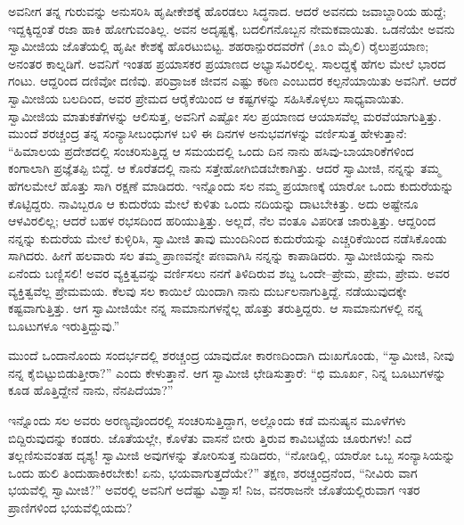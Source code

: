 ಅವನೀಗ ತನ್ನ ಗುರುವನ್ನು ಅನುಸರಿಸಿ ಹೃಷೀಕೇಶಕ್ಕೆ ಹೊರಡಲು ಸಿದ್ಧನಾದ. ಆದರೆ ಅವನದು ಜವಾಬ್ದಾರಿಯ ಹುದ್ದೆ; ಇದ್ದಕ್ಕಿದ್ದಂತೆ ರಜಾ ಹಾಕಿ ಹೋಗುವಂತಿಲ್ಲ. ಅವನ ಅದೃಷ್ಟಕ್ಕೆ, ಬದಲಿಗನೊಬ್ಬನ ನೇಮಕವಾಯಿತು. ಒಡನೆಯೇ ಅವನು ಸ್ವಾಮೀಜಿಯ ಜೊತೆಯಲ್ಲಿ ಹೃಷೀ ಕೇಶಕ್ಕೆ ಹೊರಟುಬಿಟ್ಟ. ಶಹರಾನ್ಪುರದವರೆಗೆ (೨೩೦ ಮೈಲಿ) ರೈಲುಪ್ರಯಾಣ; ಅನಂತರ ಕಾಲ್ನಡಿಗೆ. ಅವನಿಗೆ ಇಂತಹ ಪ್ರಯಾಸಕರ ಪ್ರಯಾಣದ ಅಭ್ಯಾಸವಿರಲಿಲ್ಲ. ಸಾಲದ್ದಕ್ಕೆ ಹೆಗಲ ಮೇಲೆ ಭಾರದ ಗಂಟು. ಆದ್ದರಿಂದ ದಣಿವೋ ದಣಿವು. ಪರಿವ್ರಾಜಕ ಜೀವನ ಎಷ್ಟು ಕಠಿಣ ಎಂಬುದರ ಕಲ್ಪನೆಯಾಯಿತು ಅವನಿಗೆ. ಆದರೆ ಸ್ವಾಮೀಜಿಯ ಬಲದಿಂದ, ಅವರ ಪ್ರೇಮದ ಆರೈಕೆಯಿಂದ ಆ ಕಷ್ಟಗಳನ್ನು ಸಹಿಸಿಕೊಳ್ಳಲು ಸಾಧ್ಯವಾಯಿತು. ಸ್ವಾಮೀಜಿಯ ಮಾತುಕತೆಗಳನ್ನು ಆಲಿಸುತ್ತ, ಅವನಿಗೆ ಎಷ್ಟೋ ಸಲ ಪ್ರಯಾಣದ ಆಯಾಸವೆಲ್ಲ ಮರವೆಯಾಗುತ್ತಿತ್ತು. ಮುಂದೆ ಶರಚ್ಚಂದ್ರ ತನ್ನ ಸಂನ್ಯಾಸೀಬಂಧುಗಳ ಬಳಿ ಈ ದಿನಗಳ ಅನುಭವಗಳನ್ನು ವರ್ಣಿಸುತ್ತ ಹೇಳುತ್ತಾನೆ: “ಹಿಮಾಲಯ ಪ್ರದೇಶದಲ್ಲಿ ಸಂಚರಿಸುತ್ತಿದ್ದ ಆ ಸಮಯದಲ್ಲಿ ಒಂದು ದಿನ ನಾನು ಹಸಿವು-ಬಾಯಾರಿಕೆಗಳಿಂದ ಕಂಗಾಲಾಗಿ ಪ್ರಜ್ಞೆತಪ್ಪಿ ಬಿದ್ದೆ. ಆ ಕೊರೆತದಲ್ಲಿ ನಾನು ಸತ್ತೇಹೋಗಿಬಿಡಬೇಕಾಗಿತ್ತು. ಆದರೆ ಸ್ವಾಮೀಜಿ, ನನ್ನನ್ನು ತಮ್ಮ ಹೆಗಲಮೇಲೆ ಹೊತ್ತು ಸಾಗಿ ರಕ್ಷಣೆ ಮಾಡಿದರು. ಇನ್ನೊಂದು ಸಲ ನಮ್ಮ ಪ್ರಯಾಣಕ್ಕೆ ಯಾರೋ ಒಂದು ಕುದುರೆಯನ್ನು ಕೊಟ್ಟಿದ್ದರು. ನಾವಿಬ್ಬರೂ ಆ ಕುದುರೆಯ ಮೇಲೆ ಕುಳಿತು ಒಂದು ನದಿಯನ್ನು ದಾಟಬೇಕಿತ್ತು. ಅದು ಅಷ್ಟೇನೂ ಆಳವಿರಲಿಲ್ಲ; ಆದರೆ ಬಹಳ ರಭಸದಿಂದ ಹರಿಯುತ್ತಿತ್ತು. ಅಲ್ಲದೆ, ನೆಲ ವಂತೂ ವಿಪರೀತ ಜಾರುತ್ತಿತ್ತು. ಆದ್ದರಿಂದ ನನ್ನನ್ನು ಕುದುರೆಯ ಮೇಲೆ ಕುಳ್ಳಿರಿಸಿ, ಸ್ವಾಮೀಜಿ ತಾವು ಮುಂದಿನಿಂದ ಕುದುರೆಯನ್ನು ಎಚ್ಚರಿಕೆಯಿಂದ ನಡೆಸಿಕೊಂಡು ಸಾಗಿದರು. ಹೀಗೆ ಹಲವಾರು ಸಲ ತಮ್ಮ ಪ್ರಾಣವನ್ನೇ ಪಣವಾಗಿಸಿ ನನ್ನನ್ನು ಕಾಪಾಡಿದರು. ಸ್ವಾಮೀಜಿಯನ್ನು ನಾನು ಏನೆಂದು ಬಣ್ಣಿಸಲಿ! ಅವರ ವ್ಯಕ್ತಿತ್ವವನ್ನು ವರ್ಣಿಸಲು ನನಗೆ ತಿಳಿದಿರುವ ಶಬ್ದ ಒಂದೇ–ಪ್ರೇಮ, ಪ್ರೇಮ, ಪ್ರೇಮ. ಅವರ ವ್ಯಕ್ತಿತ್ವವೆಲ್ಲ ಪ್ರೇಮಮಯ. ಕೆಲವು ಸಲ ಕಾಯಿಲೆ ಯಿಂದಾಗಿ ನಾನು ದುರ್ಬಲನಾಗುತ್ತಿದ್ದೆ. ನಡೆಯುವುದಕ್ಕೇ ಕಷ್ಟವಾಗುತ್ತಿತ್ತು. ಆಗ ಸ್ವಾಮೀಜಿಯೇ ನನ್ನ ಸಾಮಾನುಗಳನ್ನೆಲ್ಲ ಹೊತ್ತು ತರುತ್ತಿದ್ದರು. ಆ ಸಾಮಾನುಗಳಲ್ಲಿ ನನ್ನ ಬೂಟುಗಳೂ ಇರುತ್ತಿದ್ದುವು.”

ಮುಂದೆ ಒಂದಾನೊಂದು ಸಂದರ್ಭದಲ್ಲಿ ಶರಚ್ಚಂದ್ರ ಯಾವುದೋ ಕಾರಣದಿಂದಾಗಿ ದುಃಖಗೊಂಡು, “ಸ್ವಾಮೀಜಿ, ನೀವು ನನ್ನ ಕೈಬಿಟ್ಟುಬಿಡುತ್ತೀರಾ?” ಎಂದು ಕೇಳುತ್ತಾನೆ. ಆಗ ಸ್ವಾಮೀಜಿ ಛೇಡಿಸುತ್ತಾರೆ: “ಛಿ ಮೂರ್ಖ, ನಿನ್ನ ಬೂಟುಗಳನ್ನು ಕೂಡ ಹೊತ್ತಿದ್ದೇನೆ ನಾನು, ನೆನಪಿದೆಯಾ?”

ಇನ್ನೊಂದು ಸಲ ಅವರು ಅರಣ್ಯವೊಂದರಲ್ಲಿ ಸಂಚರಿಸುತ್ತಿದ್ದಾಗ, ಅಲ್ಲೊಂದು ಕಡೆ ಮನುಷ್ಯನ ಮೂಳೆಗಳು ಬಿದ್ದಿರುವುದನ್ನು ಕಂಡರು. ಜೊತೆಯಲ್ಲೇ, ಕೊಳೆತು ವಾಸನೆ ಬೀರು ತ್ತಿರುವ ಕಾವಿಬಟ್ಟೆಯ ಚೂರುಗಳು! ಎದೆ ತಲ್ಲಣಿಸುವಂತಹ ದೃಶ್ಯ! ಸ್ವಾಮೀಜಿ ಅವುಗಳನ್ನು ತೋರಿಸುತ್ತ ನುಡಿದರು, “ನೋಡಿಲ್ಲಿ, ಯಾರೋ ಒಬ್ಬ ಸಂನ್ಯಾಸಿಯನ್ನು ಒಂದು ಹುಲಿ ತಿಂದುಹಾಕಿರಬೇಕು! ಏನು, ಭಯವಾಗುತ್ತದೆಯೇ?” ತಕ್ಷಣ, ಶರಚ್ಚಂದ್ರನೆಂದ, “ನೀವಿರು ವಾಗ ಭಯವೆಲ್ಲಿ ಸ್ವಾಮೀಜಿ?” ಅವರಲ್ಲಿ ಅವನಿಗೆ ಅದೆಷ್ಟು ವಿಶ್ವಾಸ! ನಿಜ, ವನರಾಜನೇ ಜೊತೆಯಲ್ಲಿರುವಾಗ ಇತರ ಪ್ರಾಣಿಗಳಿಂದ ಭಯವೆಲ್ಲಿಯದು?

